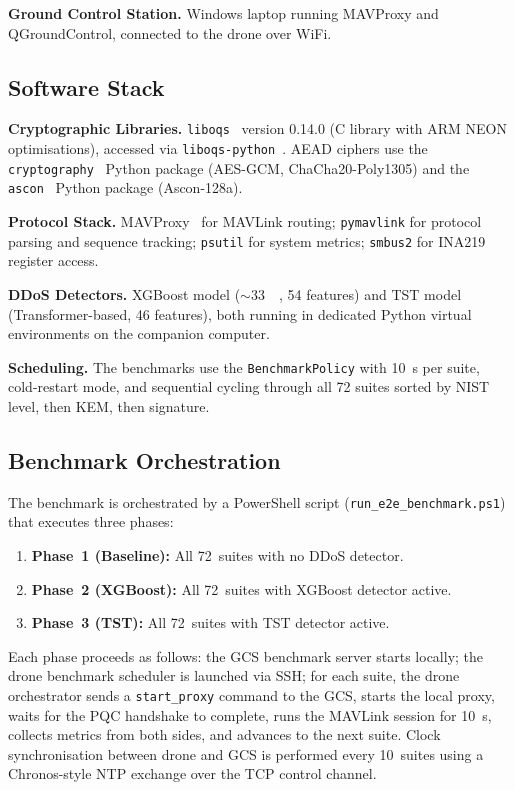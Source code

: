 \documentclass[conference]{IEEEtran}
\begin{document}
\textbf{Ground Control Station.}
Windows laptop running MAVProxy and QGroundControl, connected to the drone over WiFi.

\subsection{Software Stack}

\textbf{Cryptographic Libraries.}
\texttt{liboqs}~\cite{liboqs} version 0.14.0 (C library with ARM NEON optimisations), accessed via \texttt{liboqs-python}~\cite{oqspython}.
AEAD ciphers use the \texttt{cryptography}~\cite{cryptography-lib} Python package (AES-GCM, ChaCha20-Poly1305) and the \texttt{ascon}~\cite{ascon} Python package (Ascon-128a).

\textbf{Protocol Stack.}
MAVProxy~\cite{mavproxy} for MAVLink routing; \texttt{pymavlink} for protocol parsing and sequence tracking; \texttt{psutil} for system metrics; \texttt{smbus2} for INA219 register access.

\textbf{DDoS Detectors.}
XGBoost model ($\sim$\SI{33}{\mega\byte}, 54 features) and TST model (Transformer-based, 46 features), both running in dedicated Python virtual environments on the companion computer.

\textbf{Scheduling.}
The benchmarks use the \texttt{BenchmarkPolicy} with \SI{10}{\second} per suite, cold-restart mode, and sequential cycling through all 72 suites sorted by NIST level, then KEM, then signature.

\subsection{Benchmark Orchestration}

The benchmark is orchestrated by a PowerShell script (\texttt{run\_e2e\_benchmark.ps1}) that executes three phases:

\begin{enumerate}[noitemsep]
    \item \textbf{Phase~1 (Baseline):} All 72~suites with no DDoS detector.
    \item \textbf{Phase~2 (XGBoost):} All 72~suites with XGBoost detector active.
    \item \textbf{Phase~3 (TST):} All 72~suites with TST detector active.
\end{enumerate}

Each phase proceeds as follows: the GCS benchmark server starts locally; the drone benchmark scheduler is launched via SSH; for each suite, the drone orchestrator sends a \texttt{start\_proxy} command to the GCS, starts the local proxy, waits for the PQC handshake to complete, runs the MAVLink session for \SI{10}{\second}, collects metrics from both sides, and advances to the next suite.
Clock synchronisation between drone and GCS is performed every 10~suites using a Chronos-style NTP exchange over the TCP control channel.
\end{document}
